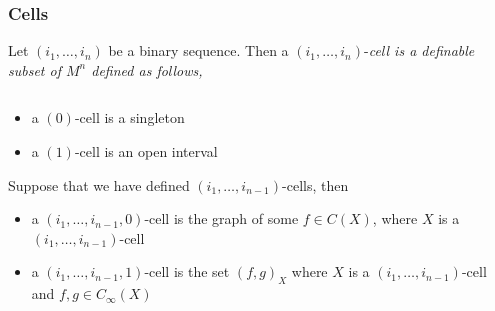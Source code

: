 \begin{frame}[c]\frametitle{Cells}

		Let $(i_1,\ldots,i_n)$ be a binary sequence. Then a $(i_1,\ldots,i_n)$-\em cell \em is a definable subset of $M^n$ defined as follows,
		\begin{columns}

			\begin{column}{7cm}
					\begin{itemize}
						\item a $(0)$-cell is a singleton
						\item a $(1)$-cell is an open interval
					\end{itemize}
					Suppose that we have defined $(i_1,\ldots,i_{n-1})$-cells, then
					\begin{itemize}
						\item<2-> a $(i_1,\ldots,i_{n-1},0)$-cell is the graph of some $f \in C(X)$,
						where $X$ is a  $(i_1,\ldots,i_{n-1})$-cell
						\item<3-> a $(i_1,\ldots,i_{n-1},1)$-cell is the set $(f,g)_X$ where $X$ is a
						$(i_1,\ldots,i_{n-1})$-cell and $f,g \in C_\infty(X)$
					\end{itemize}

			\end{column}

			\begin{column}{4cm}



			\end{column}


		\end{columns}
\end{frame}

